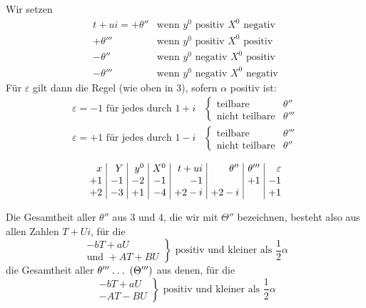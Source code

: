 Wir setzen
\[
\begin{array}{rl}
t+ui=+\theta''&\text{wenn }y^0\text{ positiv }X^0\text{ negativ}\\
+\theta'''&\text{wenn }y^0\text{ positiv }X^0\text{ positiv}\\
-\theta''&\text{wenn }y^0\text{ negativ }X^0\text{ positiv}\\
-\theta'''&\text{wenn }y^0\text{ negativ }X^0\text{ negativ}
\end{array}
\]
Für $\varepsilon$ gilt dann die Regel (wie oben in 3), sofern $\alpha$ positiv ist:
\[
\begin{aligned}
\varepsilon=-1\text{ für jedes durch }1+i&\left\{\begin{array}{ll}\text{teilbare}&\theta''\\\text{nicht teilbare}&\theta'''\end{array}\right.\\[3pt]
\varepsilon=+1\text{ für jedes durch }1-i&\left\{\begin{array}{ll}\text{teilbare}&\theta'''\\\text{nicht teilbare}&\theta''\end{array}\right.
\end{aligned}
\]

\[
\setlength{\arraycolsep}{4pt}
\begin{array}{r|r|r|r|r|r|r|r}
x&Y&y^0&X^0&t+ui&\theta''&\theta'''&\varepsilon\\
+1&-1&-2&-1&-1&&+1&-1\\
+2&-3&+1&-4&+2-i&+2-i&&+1
\end{array}
\]

Die Gesamtheit aller $\theta''$ aus 3 und 4, die wir mit $\Theta''$ bezeichnen, besteht also aus allen Zahlen $T+Ui$, für die
\[
\left.\begin{array}{r}
-bT+aU\\
\text{und }+AT+BU
\end{array}\right\}\text{ positiv und kleiner als }\frac12\alpha
\]
die Gesamtheit aller $\theta'''\mathbin{.}\mathbin{.}\mathbin{.}\;(\Theta''')$ aus denen, für die
\[
\left.\begin{array}{r}
-bT+aU\\
-AT-BU
\end{array}\right\}\text{ positiv und kleiner als }\frac12\alpha
\]

